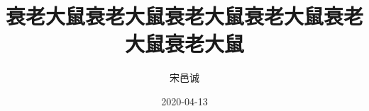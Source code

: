 \documentclass[a4paper, 12pt, smd, fontset=windows]{HBUThesis}
\date{2020-04-13}
\title{衰老大鼠衰老大鼠衰老大鼠衰老大鼠衰老大鼠衰老大鼠}
\author{宋邑诚}
\begin{document}
\makecover
\layout
\end{document}
